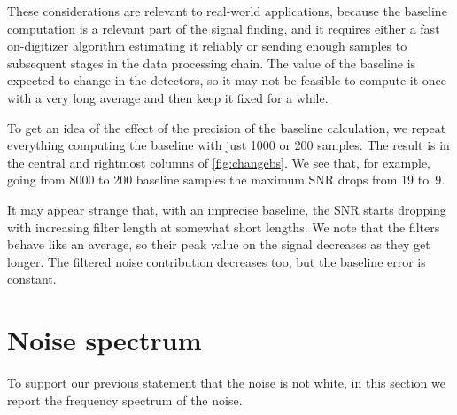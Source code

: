 These considerations are relevant to real-world applications, because the
baseline computation is a relevant part of the signal finding, and it requires
either a fast on-digitizer algorithm estimating it reliably or sending enough
samples to subsequent stages in the data processing chain. The value of the
baseline is expected to change in the detectors, so it may not be feasible to
compute it once with a very long average and then keep it fixed for a while.

To get an idea of the effect of the precision of the baseline calculation, we
repeat everything computing the baseline with just 1000 or 200 samples. The
result is in the central and rightmost columns of \autoref{fig:changebs}. We
see that, for example, going from 8000 to 200 baseline samples the maximum SNR
drops from 19 to~9.

It may appear strange that, with an imprecise baseline, the SNR starts dropping
with increasing filter length at somewhat short lengths. We note that the
filters behave like an average, so their peak value on the signal decreases as
they get longer. The filtered noise contribution decreases too, but the
baseline error is constant.

\begin{figure}[t]
    
    

\end{figure}

\section{Noise spectrum}
\label{sec:spectrum}

To support our previous statement that the noise is not white, in this section
we report the frequency spectrum of the noise.

